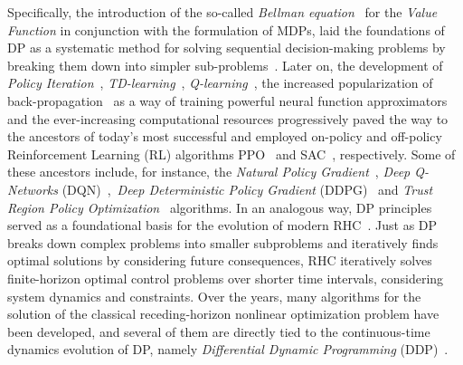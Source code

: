 Specifically, the introduction of the so-called \textit{Bellman equation}~\cite{rl:bellman1960dynamic} for the \textit{Value Function} in conjunction with the formulation of MDPs, laid the foundations of DP as a systematic method for solving sequential decision-making problems by breaking them down into simpler sub-problems~\cite{rl:bellman1960dynamic}. Later on, the development of \textit{Policy Iteration}~\cite{rl:howard1960dynamic}, \textit{TD-learning}~\cite{rl:barto1983neuronlike}, \textit{Q-learning}~\cite{rl:watkins1989learning}, the increased popularization of back-propagation~\cite{rl:rumelhart1986learning} as a way of training powerful neural function approximators and the ever-increasing computational resources progressively paved the way to the ancestors of today's most successful and employed on-policy and off-policy Reinforcement Learning (RL) algorithms PPO~\cite{rl:schulman2017proximal} and SAC~\cite{rl:haarnoja2018soft}, respectively. Some of these ancestors include, for instance, the \textit{Natural Policy Gradient}~\cite{rl:kakade2001natural}, \textit{Deep Q-Networks} (DQN)~\cite{rl:mnih2015human},~\textit{Deep Deterministic Policy Gradient} (DDPG)~\cite{rl:lillicrap2015continuous} and \textit{Trust Region Policy Optimization}~\cite{rl:schulman2015trust} algorithms.
In an analogous way, DP principles served as a foundational basis for the evolution of modern RHC~\cite{modern_mpc:grandia2023perceptive}.
Just as DP breaks down complex problems into smaller subproblems and iteratively finds optimal solutions by considering future consequences, RHC iteratively solves finite-horizon optimal control problems over shorter time intervals, considering system dynamics and constraints. Over the years, many algorithms for the solution of the classical receding-horizon nonlinear optimization problem have been developed, and several of them are directly tied to the continuous-time dynamics evolution of DP, namely \textit{Differential Dynamic Programming} (DDP)~\cite{rhc:jacobson1970differential,rhc:todorov2005generalized,rhc:diehl2009efficient,rhc:tassa2012synthesis}.